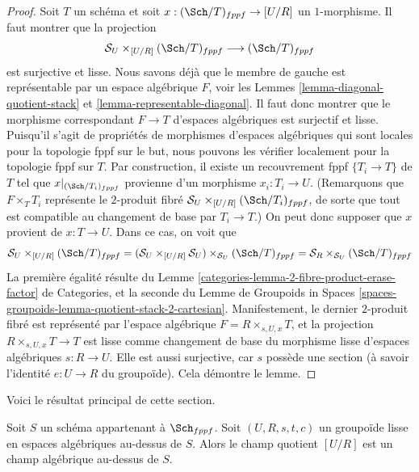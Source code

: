 \begin{proof}
Soit $T$ un schéma et soit $x : (\Sch/T)_{fppf} \to [U/R]$
un $1$-morphisme. Il faut montrer que la projection
$$
\mathcal{S}_U \times_{[U/R]} (\Sch/T)_{fppf}
\longrightarrow
(\Sch/T)_{fppf}
$$
est surjective et lisse. Nous savons déjà que le membre de gauche
est représentable par un espace algébrique $F$, voir les
Lemmes \ref{lemma-diagonal-quotient-stack} et
\ref{lemma-representable-diagonal}.
Il faut donc montrer que le morphisme correspondant $F \to T$
d'espaces algébriques est surjectif et lisse.
Puisqu'il s'agit de propriétés de morphismes d'espaces algébriques
qui sont locales pour la topologie fppf sur le but, nous
pouvons les vérifier localement pour la topologie fppf sur $T$. Par construction, il existe
un recouvrement fppf $\{T_i \to T\}$ de $T$ tel que
$x|_{(\Sch/T_i)_{fppf}}$ provienne d'un morphisme
$x_i : T_i \to U$. (Remarquons que $F \times_T T_i$ représente le
$2$-produit fibré $\mathcal{S}_U \times_{[U/R]} (\Sch/T_i)_{fppf}$,
de sorte que tout est compatible au changement de base par $T_i \to T$.)
On peut donc supposer que $x$ provient de $x : T \to U$.
Dans ce cas, on voit que
$$
\mathcal{S}_U \times_{[U/R]} (\Sch/T)_{fppf}
=
(\mathcal{S}_U \times_{[U/R]} \mathcal{S}_U)
\times_{\mathcal{S}_U} (\Sch/T)_{fppf}
=
\mathcal{S}_R \times_{\mathcal{S}_U} (\Sch/T)_{fppf}
$$
La première égalité résulte du
Lemme \ref{categories-lemma-2-fibre-product-erase-factor} de Categories,
et la seconde du
Lemme de Groupoids in Spaces
\ref{spaces-groupoids-lemma-quotient-stack-2-cartesian}.
Manifestement, le dernier $2$-produit fibré est représenté par l'espace
algébrique $F = R \times_{s, U, x} T$, et la projection
$R \times_{s, U, x} T \to T$ est lisse comme changement de base du
morphisme lisse d'espaces algébriques $s : R \to U$.
Elle est aussi surjective, car $s$ possède une section (à savoir l'identité
$e : U \to R$ du groupoïde).
Cela démontre le lemme.
\end{proof}

\noindent
Voici le résultat principal de cette section.

\begin{theorem}
\label{theorem-smooth-groupoid-gives-algebraic-stack}
Soit $S$ un schéma appartenant à $\Sch_{fppf}$.
Soit $(U, R, s, t, c)$ un groupoïde lisse en espaces algébriques au-dessus de $S$.
Alors le champ quotient $[U/R]$ est un champ algébrique au-dessus de $S$.
\end{theorem}


